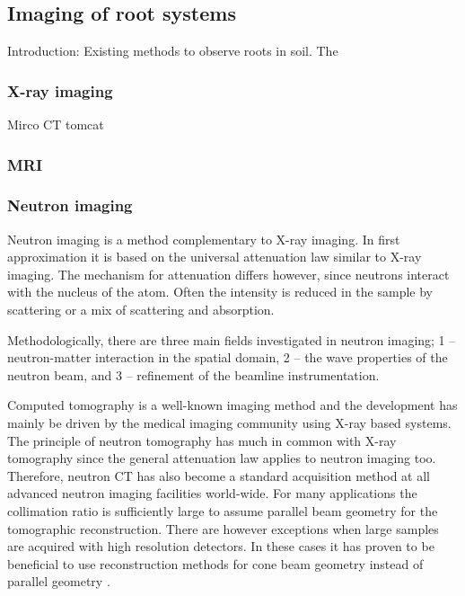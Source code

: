 \documentclass[a4paper,11pt]{scrreprt}
\begin{document}
\subsection{Imaging of root systems}
Introduction: Existing methods to observe roots in soil.
The 
\subsubsection{X-ray imaging}
Mirco CT tomcat

\subsubsection{MRI}

\subsubsection{Neutron imaging}
Neutron imaging is a method complementary to X-ray imaging. In first approximation it is 
based on the universal attenuation law similar to X-ray imaging. The mechanism for attenuation differs
however, since neutrons interact with the nucleus of the atom. Often the intensity is reduced
in the sample by scattering or a mix of scattering and absorption.

Methodologically, there are three main fields investigated in neutron imaging; 1
-- neutron-matter interaction in the spatial domain, 2 -- the wave properties of 
the neutron beam,  and 3 -- refinement of the beamline instrumentation.

Computed tomography is a well-known imaging method and the development has
mainly be driven by the medical imaging community using X-ray based systems. The principle
of neutron tomography has much in common with X-ray tomography since the general
attenuation law applies to neutron imaging too. Therefore, neutron CT has also 
become a standard acquisition method at all advanced neutron imaging facilities 
world-wide. For many applications the collimation ratio is sufficiently large to assume
parallel beam geometry for the tomographic reconstruction. There are however
exceptions when large samples are acquired with high resolution detectors. In
these cases it has proven to be beneficial to use reconstruction methods for
cone beam geometry instead of parallel geometry \cite{kaestner2012_wcndt}. 
\end{document}
